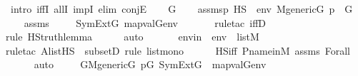 \begin{isabellebody}
\ {\isacharparenleft}{\kern0pt}intro\ iffI\ allI\ impI{\isacharcomma}{\kern0pt}\ elim\ conjE{\isacharparenright}{\kern0pt}\isanewline
\ \ \isamarkupfalse%
\ G\isanewline
\ \ \isamarkupfalse%
\ assms{}{\isacharcolon}{\kern0pt}{\isachardoublequoteopen}{\isacharparenleft}{\kern0pt}p\ {\isasymtturnstile}HS\ {\isasymphi}\ env{\isacharparenright}{\kern0pt}{\isachardoublequoteclose}\ {\isachardoublequoteopen}M{\isacharunderscore}{\kern0pt}generic{\isacharparenleft}{\kern0pt}G{\isacharparenright}{\kern0pt}{\isachardoublequoteclose}\ {\isachardoublequoteopen}p\ {\isasymin}\ G{\isachardoublequoteclose}\isanewline
\ \ \isamarkupfalse%
\ assms\ \isanewline
\ \ \isamarkupfalse%
\ {\isachardoublequoteopen}SymExt{\isacharparenleft}{\kern0pt}G{\isacharparenright}{\kern0pt}{\isacharcomma}{\kern0pt}\ map{\isacharparenleft}{\kern0pt}val{\isacharparenleft}{\kern0pt}G{\isacharparenright}{\kern0pt}{\isacharcomma}{\kern0pt}env{\isacharparenright}{\kern0pt}\ {\isasymTurnstile}\ {\isasymphi}{\isachardoublequoteclose}\isanewline
\ \ \ \ \isamarkupfalse%
{\isacharparenleft}{\kern0pt}rule{\isacharunderscore}{\kern0pt}tac\ iffD{}{\isacharparenright}{\kern0pt}\isanewline
\ \ \ \ \ \isamarkupfalse%
{\isacharparenleft}{\kern0pt}rule\ HS{\isacharunderscore}{\kern0pt}truth{\isacharunderscore}{\kern0pt}lemma{\isacharparenright}{\kern0pt}\isanewline
\ \ \ \ \isamarkupfalse%
\ auto\isanewline
{}\isamarkupfalse%
\isanewline
\ \ \isanewline
\ \ \isamarkupfalse%
\ envin\ {\isacharcolon}{\kern0pt}\ {\isachardoublequoteopen}env\ {\isasymin}\ list{\isacharparenleft}{\kern0pt}M{\isacharparenright}{\kern0pt}{\isachardoublequoteclose}\ \isanewline
\ \ \ \ \isamarkupfalse%
{\isacharparenleft}{\kern0pt}rule{\isacharunderscore}{\kern0pt}tac\ A{\isacharequal}{\kern0pt}{\isachardoublequoteopen}list{\isacharparenleft}{\kern0pt}HS{\isacharparenright}{\kern0pt}{\isachardoublequoteclose}\ \ subsetD{\isacharcomma}{\kern0pt}\ rule\ list{\isacharunderscore}{\kern0pt}mono{\isacharparenright}{\kern0pt}\isanewline
\ \ \ \ \isamarkupfalse%
\ HS{\isacharunderscore}{\kern0pt}iff\ P{\isacharunderscore}{\kern0pt}name{\isacharunderscore}{\kern0pt}in{\isacharunderscore}{\kern0pt}M\ assms\ Forall\isanewline
\ \ \ \ \isamarkupfalse%
\ auto\isanewline
\isanewline
\ \ \isamarkupfalse%
\ {}{\isacharcolon}{\kern0pt}\ {\isachardoublequoteopen}{\isasymforall}G{\isachardot}{\kern0pt}{\isacharparenleft}{\kern0pt}M{\isacharunderscore}{\kern0pt}generic{\isacharparenleft}{\kern0pt}G{\isacharparenright}{\kern0pt}{\isasymand}\ p{\isasymin}G{\isacharparenright}{\kern0pt}{\isasymlongrightarrow}\ SymExt{\isacharparenleft}{\kern0pt}G{\isacharparenright}{\kern0pt}\ {\isacharcomma}{\kern0pt}\ map{\isacharparenleft}{\kern0pt}val{\isacharparenleft}{\kern0pt}G{\isacharparenright}{\kern0pt}{\isacharcomma}{\kern0pt}env{\isacharparenright}{\kern0pt}\ {\isasymTurnstile}\ {\isasymphi}{\isachardoublequoteclose}\isanewline

\end{isabellebody}
